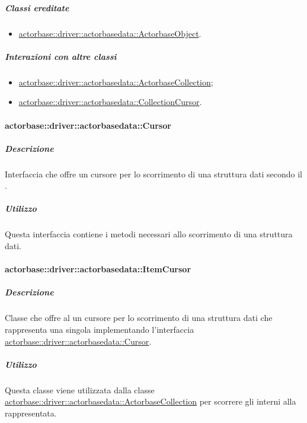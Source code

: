 \documentclass{scalatekids-article}
\begin{document}
\subparagraph{Classi ereditate}

\begin{itemize}
\item \hyperref[sec:actorbase::driver::actorbasedata::ActorbaseObject]{actorbase::driver::actorbasedata::ActorbaseObject}.
\end{itemize}

\subparagraph{Interazioni con altre classi}

\begin{itemize}
\item \hyperref[sec:actorbase::driver::actorbasedata::ActorbaseCollection]{actorbase::driver::actorbasedata::ActorbaseCollection};
\item \hyperref[sec:actorbase::driver::actorbasedata::CollectionCursor]{actorbase::driver::actorbasedata::CollectionCursor}.
\end{itemize}

\paragraph{actorbase::driver::actorbasedata::Cursor}
\label{sec:actorbase::driver::actorbasedata::Cursor}

\subparagraph{Descrizione}

Interfaccia che offre un cursore per lo scorrimento di una struttura dati
secondo il  .

\subparagraph{Utilizzo}

Questa interfaccia contiene i metodi necessari allo scorrimento di una
struttura dati.

\paragraph{actorbase::driver::actorbasedata::ItemCursor}
\label{sec:actorbase::driver::actorbasedata::ItemCursor}

\subparagraph{Descrizione}

Classe che offre al  un cursore per lo scorrimento di una struttura dati
che rappresenta una singola  implementando l'interfaccia
\hyperref[sec:actorbase::driver::actorbasedata::Cursor]{actorbase::driver::actorbasedata::Cursor}.

\subparagraph{Utilizzo}

Questa classe viene utilizzata dalla classe
\hyperref[sec:actorbase::driver::actorbasedata::ActorbaseCollection]{actorbase::driver::actorbasedata::ActorbaseCollection}
per scorrere gli  interni alla 
rappresentata.
\end{document}
